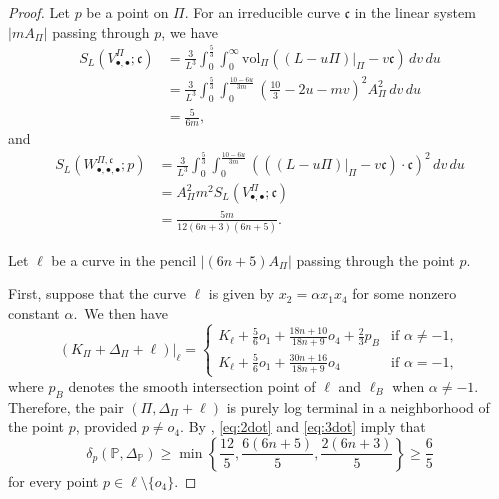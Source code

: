 \documentclass[12pt]{amsart}
\theoremstyle{definition}
\theoremstyle{remark}
\begin{document}
\begin{proof}
Let $p$ be a point on $\Pi$.  
For an irreducible curve $\mathfrak{c}$ in the linear system $|mA_\Pi|$ passing through $p$,  we have
\begin{equation}\label{eq:2dot}
\begin{split}
S_L  (V_{\bullet, \bullet}^{\Pi}; \mathfrak{c}) 
&= \frac{3}{L^3} \int_0^{\frac{5}{3}} \int_0^{\infty} \mathrm{vol}_{\Pi} \left(\left(L - u \Pi\right)|_{\Pi} - v \mathfrak{c}\right)\,dv \,du \\
&= \frac{3}{L^3} \int_0^{\frac{5}{3}} \int_0^{\frac{10-6u}{3m}} \left(\frac{10}{3}-2u- mv \right)^2 A_\Pi^2 \,dv \,du \\
&= \frac{5}{6m},
\end{split}
\end{equation}
and
\begin{equation}\label{eq:3dot}
\begin{split}
S_L (W_{\bullet, \bullet, \bullet}^{\Pi, \mathfrak{c}}; p) 
&= \frac{3}{L^3}\int_0^{\frac{5}{3}}  \int_0^{\frac{10-6u}{3m}}\left( \left(\left(L - u \Pi\right)|_{\Pi} - v \mathfrak{c}\right) \cdot\mathfrak{c}\right)^2\, dv \, du \\
&= A_\Pi^2m^2S_L  (V_{\bullet, \bullet}^{\Pi}; \mathfrak{c})  \\
&= \frac{5m}{12(6n+3)(6n+5)}.
\end{split}
\end{equation}




Let $\ell$ be a curve in the pencil $|(6n+5)A_\Pi|$ passing through the point $p$.

First, suppose that the curve $\ell$ is given by $x_2=\alpha x_1x_4$ for some nonzero constant $\alpha$.\
We then have 
\[\left(K_\Pi+\Delta_\Pi+\ell\right)\big|_\ell= 
\begin{cases}
K_\ell+\frac{5}{6}o_1+ \frac{18n+10}{18n+9}o_4 +\frac{2}{3}p_B & \text{if $\alpha\ne -1$}, \\
K_\ell+\frac{5}{6}o_1+ \frac{30n+16}{18n+9}o_4 & \text{if $\alpha= -1$},
\end{cases}
\]
where $p_B$ denotes the smooth intersection point of $\ell$ and $\ell_B$ when $\alpha\ne -1$.
Therefore, the pair $(\Pi, \Delta_\Pi+\ell)$ is purely log terminal in a neighborhood of  the point $p$, provided $p\ne o_4$. 
By \cite[Corollary~4.8]{Fu23},  \eqref{eq:2dot} and \eqref{eq:3dot} imply that
\[\delta_p\left(\mathbb{P}, \Delta_\mathbb{P}\right)\geq \min\left\{\frac{12}{5}, \frac{6(6n+5)}{5}, \frac{2(6n+3)}{5}\right\}\geq\frac{6}{5}\]
for every point $p\in \ell\setminus\{o_4\}$.



\end{proof}
\end{document}
